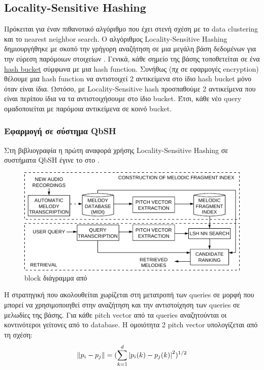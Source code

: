 \newcommand*{\ls}{Locality-Sensitive}%
\newcommand*{\lsh}{Locality-Sensitive Hashing}%
\subsection{\lsh{}}\label{sub:lsh}
Πρόκειται για έναν πιθανοτικό αλγόριθμο που έχει στενή σχέση με το data clustering και το nearest neighbor search.
O αλγόριθμος \lsh{} δημιουργήθηκε με σκοπό την γρήγορη αναζήτηση σε μια μεγάλη βάση δεδομένων για την εύρεση παρόμοιων στοιχείων \cite{slaney2008locality}.
Γενικά, κάθε σημείο της βάσης τοποθετείται σε ένα \href{https://en.wikipedia.org/wiki/Hash_table}{hash bucket} σύμφωνα με μια hash function.
Συνήθως (πχ σε εφαρμογές encryption) θέλουμε μια hash function να αντιστοιχεί 2 αντικείμενα στο ίδιο hash bucket μόνο όταν είναι ίδια.
Ωστόσο, με \ls{} hash προσπαθούμε 2 αντικείμενα που είναι περίπου ίδια να τα αντιστοιχήσουμε στο ίδιο bucket.
Έτσι, κάθε νέο query ομαδοποιείται με παρόμοια αντικείμενα σε κοινό bucket.

\subsubsection{Εφαρμογή σε σύστημα QbSH}
Στη βιβλιογραφία η πρώτη αναφορά χρήσης \lsh{} σε συστήματα QbSH έγινε το \citeyear{ryynanen2008query} στο \cite{ryynanen2008query}.

\begin{figure}
        \centering
        \vspace{-20pt}\includegraphics[width=\linewidth]{ryynanen2008query}
        \vspace{-20pt}\caption{block διάγραμμα από \protect\cite{ryynanen2008query}}
        \label{fig:ryynanen2008query}
\end{figure}

Η στρατηγική που ακολουθείται χωρίζεται στη
μετατροπή των queries σε μορφή που μπορεί να χρησιμοποιηθεί στην αναζήτηση και
την αντιστοίχηση των queries σε μελωδίες της βάσης.
Για κάθε pitch vector από τα queries αναζητούνται οι κοντινότεροι γείτονες από το database.
Η ομοιότητα 2 pitch vector υπολογίζεται από τη σχέση:
\begin{equation*}
\left\lVert p_i - p_j\right\rVert = (\sum\limits_{k=1}^{d}\left\lvert p_i(k) - p_j(k)\right\rvert^2)^{1/2}
\end{equation*}

